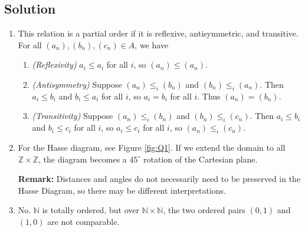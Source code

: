 \documentclass{article}
\begin{document}
\subsection*{Solution}
    \begin{enumerate}
        \item This relation is a partial order if it is reflexive, antisymmetric, and transitive. For all $(a_{n}), (b_{n}), (c_{n}) \in A$, we have
        \begin{enumerate}[label = \arabic*.]
            \item \textit{(Reflexivity)} $a_{i} \le a_{i}$ for all $i$, so $(a_{n}) \le (a_{n})$.
            \item \textit{(Antisymmetry)} Suppose $(a_{n}) \le_{i} (b_{n})$ and $(b_{n}) \le_{i} (a_{n})$. Then $a_{i} \le b_{i}$ and $b_{i} \le a_{i}$ for all $i$, so $a_{i} = b_{i}$ for all $i$. Thus $(a_{n}) = (b_{n})$.
            \item \textit{(Transitivity)} Suppose $(a_{n}) \le_{i} (b_{n})$ and $(b_{n}) \le_{i} (c_{n})$. Then $a_{i} \le b_{i}$ and $b_{i} \le c_{i}$ for all $i$, so $a_{i} \le c_{i}$ for all $i$, so $(a_{n}) \le_{i} (c_{n})$.
        \end{enumerate}
        \item For the Hasse diagram, see Figure \ref{fig:Q1}. If we extend the domain to all $\mathbb{Z} \times \mathbb{Z}$, the diagram becomes a $45^{\circ}$ rotation of the Cartesian plane. 
        
        \vspace{1.5mm}
        \textbf{Remark:} Distances and angles do not necessarily need to be preserved in the Hasse Diagram, so there may be different interpretations.
        \item No. $\mathbb{N}$ is totally ordered, but over $\mathbb{N} \times \mathbb{N}$, the two ordered pairs $(0, 1)$ and $(1, 0)$ are not comparable.
    \end{enumerate}
\end{document}
